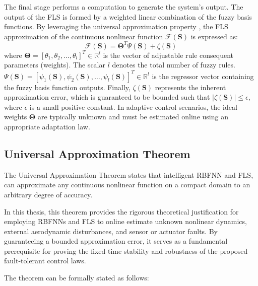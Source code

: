 The final stage performs a computation to generate the system's output. The output of the FLS is formed by a weighted linear combination of the fuzzy basis functions. By leveraging the universal approximation property  \cite{wang1992}, the FLS approximation of the continuous nonlinear function $\mathcal{F}(\mathbf{S})$ is expressed as:
\begin{equation}
    \mathcal{F}(\mathbf{S}) = \boldsymbol{\Theta}^T \Psi(\mathbf{S}) + \zeta(\mathbf{S})
    \label{eq:fls_approx}
\end{equation}
where $\boldsymbol{\Theta} = [\theta_1, \theta_2, \dots, \theta_l]^T \in \mathbb{R}^l$ is the vector of adjustable rule consequent parameters (weights). The scalar $l$ denotes the total number of fuzzy rules. $\Psi(\mathbf{S}) = [\psi_1(\mathbf{S}), \psi_2(\mathbf{S}), \dots, \psi_l(\mathbf{S})]^T \in \mathbb{R}^l$ is the regressor vector containing the fuzzy basis function outputs. Finally, $\zeta(\mathbf{S})$ represents the inherent approximation error, which is guaranteed to be bounded such that $|\zeta(\mathbf{S})| \le \epsilon$, where $\epsilon$ is a small positive constant. In adaptive control scenarios, the ideal weights $\boldsymbol{\Theta}$ are typically unknown and must be estimated online using an appropriate adaptation law.







\subsection{Universal Approximation Theorem}
\label{sec:universal_approximation}

The Universal Approximation Theorem states that intelligent RBFNN and FLS, can approximate any continuous nonlinear function on a compact domain to an arbitrary degree of accuracy. 

In this thesis, this theorem provides the rigorous theoretical justification for employing RBFNNs and FLS to online estimate unknown nonlinear dynamics, external aerodynamic disturbances, and sensor or actuator faults. By guaranteeing a bounded approximation error, it serves as a fundamental prerequisite for proving the fixed-time stability and robustness of the proposed fault-tolerant control laws.

The theorem can be formally stated as follows:

